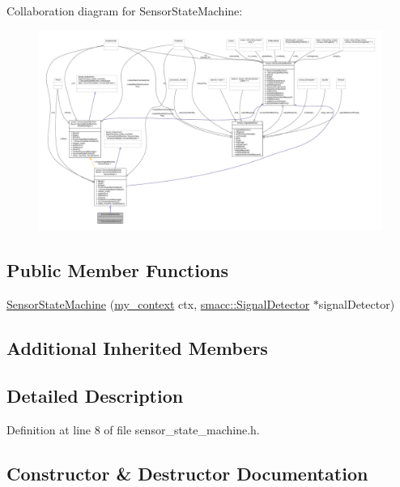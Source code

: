 Collaboration diagram for Sensor\+State\+Machine\+:
\nopagebreak
\begin{figure}[H]
\begin{center}
\leavevmode
\includegraphics[width=350pt]{structSensorStateMachine__coll__graph}
\end{center}
\end{figure}
\subsection*{Public Member Functions}
\begin{DoxyCompactItemize}
\item 
\hyperlink{structSensorStateMachine_ab923d35d47081f5a87b8cfab382c2b41}{Sensor\+State\+Machine} (\hyperlink{common_8h_af2dcacead80d69b96952496fe413bbfe}{my\+\_\+context} ctx, \hyperlink{classsmacc_1_1SignalDetector}{smacc\+::\+Signal\+Detector} $\ast$signal\+Detector)
\end{DoxyCompactItemize}
\subsection*{Additional Inherited Members}


\subsection{Detailed Description}


Definition at line 8 of file sensor\+\_\+state\+\_\+machine.\+h.



\subsection{Constructor \& Destructor Documentation}
